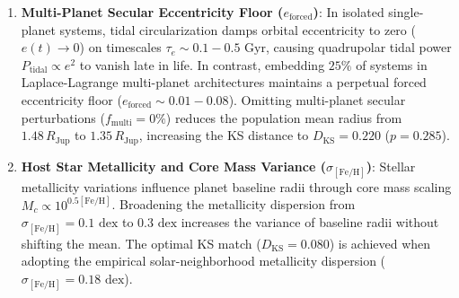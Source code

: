 \begin{enumerate}
    \item \textbf{Multi-Planet Secular Eccentricity Floor ($e_{\mathrm{forced}}$)}:
    In isolated single-planet systems, tidal circularization damps orbital eccentricity to zero ($e(t) \to 0$) on timescales $\tau_e \sim 0.1 - 0.5\text{ Gyr}$, causing quadrupolar tidal power $P_{\text{tidal}} \propto e^2$ to vanish late in life. In contrast, embedding $25\%$ of systems in Laplace-Lagrange multi-planet architectures maintains a perpetual forced eccentricity floor ($e_{\mathrm{forced}} \sim 0.01 - 0.08$). Omitting multi-planet secular perturbations ($f_{\text{multi}} = 0\%$) reduces the population mean radius from $1.48\,R_{\mathrm{Jup}}$ to $1.35\,R_{\mathrm{Jup}}$, increasing the KS distance to $D_{\mathrm{KS}} = 0.220$ ($p = 0.285$).

    \item \textbf{Host Star Metallicity and Core Mass Variance ($\sigma_{[\mathrm{Fe/H}]}$)}:
    Stellar metallicity variations influence planet baseline radii through core mass scaling $M_c \propto 10^{0.5[\mathrm{Fe/H}]}$. Broadening the metallicity dispersion from $\sigma_{[\mathrm{Fe/H}]} = 0.1\text{ dex}$ to $0.3\text{ dex}$ increases the variance of baseline radii without shifting the mean. The optimal KS match ($D_{\mathrm{KS}} = 0.080$) is achieved when adopting the empirical solar-neighborhood metallicity dispersion ($\sigma_{[\mathrm{Fe/H}]} = 0.18\text{ dex}$).
\end{enumerate}
